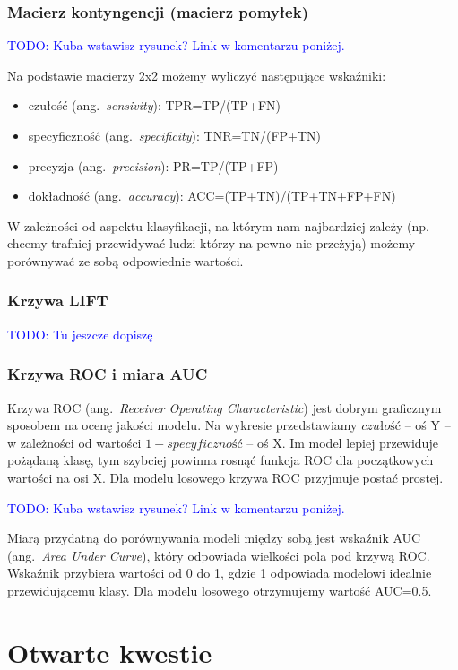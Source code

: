 \documentclass{article}
\newcommand{\TODO}[1]{\textcolor{blue}{TODO: #1}}
\newcommand{\ang}[1]{ang.~{\itshape #1}}
\begin{document}
\subsubsection{Macierz kontyngencji (macierz pomyłek)}
\TODO{Kuba wstawisz rysunek? Link w komentarzu poniżej.}

Na podstawie macierzy 2x2 możemy wyliczyć następujące wskaźniki:
\begin{itemize}
\item czułość (\ang{sensivity}): TPR=TP/(TP+FN)
\item specyficzność (\ang{specificity}): TNR=TN/(FP+TN)
\item precyzja (\ang{precision}): PR=TP/(TP+FP)
\item dokładność (\ang{accuracy}): ACC=(TP+TN)/(TP+TN+FP+FN)
\end{itemize}

W zależności od aspektu klasyfikacji, na którym nam najbardziej zależy (np. chcemy trafniej przewidywać ludzi którzy na pewno nie przeżyją) możemy porównywać ze sobą odpowiednie wartości.

\subsubsection{Krzywa LIFT}
\TODO{Tu jeszcze dopiszę}

\subsubsection{Krzywa ROC i miara AUC}
Krzywa ROC (\ang{Receiver Operating Characteristic}) jest dobrym graficznym sposobem na ocenę jakości modelu. Na wykresie przedstawiamy $czułość$ -- oś Y -- w zależności od wartości $1-specyficzność$ -- oś X. Im model lepiej przewiduje pożądaną klasę, tym szybciej powinna rosnąć funkcja ROC dla początkowych wartości na osi X. Dla modelu losowego krzywa ROC przyjmuje postać prostej.

\TODO{Kuba wstawisz rysunek? Link w komentarzu poniżej.}

Miarą przydatną do porównywania modeli między sobą jest wskaźnik AUC (\ang{Area Under Curve}), który odpowiada wielkości pola pod krzywą ROC. Wskaźnik przybiera wartości od 0 do 1, gdzie 1 odpowiada modelowi idealnie przewidującemu klasy. Dla modelu losowego otrzymujemy wartość AUC=0.5.

\section{Otwarte kwestie}
\end{document}

